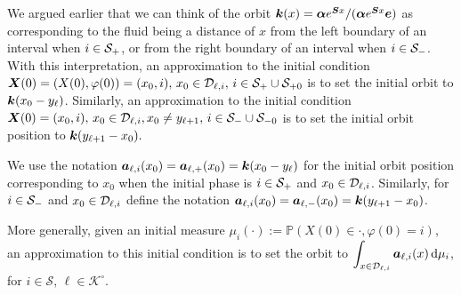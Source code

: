 We argued earlier that we can think of the orbit \(\boldsymbol k(x)=\boldsymbol \alpha e^{\boldsymbol S x}/(\boldsymbol \alpha e^{\boldsymbol S x}\boldsymbol e)\) as corresponding to the fluid being a distance of \(x\) from the left boundary of an interval when \(i\in\mathcal{S}_+\), or from the right boundary of an interval when \(i\in\mathcal{S}_-\). With this interpretation, an approximation to the initial condition \(\boldsymbol X(0) = (X(0),\varphi(0))=(x_0,i),\,x_0\in\mathcal D_{\ell,i},\,i\in\mathcal S_+\cup\mathcal{S}_{+0}\) is to set the initial orbit to \(\boldsymbol k(x_0-y_{\ell})\). Similarly, an approximation to the initial condition \(\boldsymbol X(0)=(x_0,i), \,x_0\in\mathcal D_{\ell,i}, x_0\neq y_{\ell+1},\,i\in\mathcal S_-\cup\mathcal{S}_{-0}\) is to set the initial orbit position to \(\boldsymbol k(y_{\ell+1}-x_0).\) 

We use the notation \(\boldsymbol a_{\ell,i}(x_0) = \boldsymbol a_{\ell,+}(x_0) = \boldsymbol k(x_0-y_\ell)\) for the initial orbit position corresponding to \(x_0\) when the initial phase is \(i\in\mathcal{S}_+\) and \(x_0\in\mathcal{D}_{\ell,i}\). Similarly, for \(i\in\mathcal{S}_-\) and \(x_0\in\mathcal{D}_{\ell,i}\) define the notation \(\boldsymbol a_{\ell,i}(x_0) = \boldsymbol a_{\ell,-}(x_0) = \boldsymbol k(y_{\ell+1}-x_0)\). 

More generally, given an initial measure \(\mu_i(\cdot):= \mathbb P(X(0)\in\cdot,\varphi(0)=i)\), an approximation to this initial condition is to set the orbit to \(\displaystyle\int_{x\in\mathcal{D}_{\ell,i}}\boldsymbol a_{\ell,i} (x) \, \mathrm{d} \mu_i\), for \(i\in\mathcal S,\, \ell\in\mathcal K^\circ\). 

